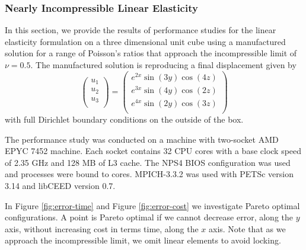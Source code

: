 \subsubsection{Nearly Incompressible Linear Elasticity}

In this section, we provide the results of performance studies for the linear elasticity formulation on a three dimensional unit cube using a manufactured solution for a range of Poisson's ratios that approach the incompressible limit of $\nu = 0.5$.
The manufactured solution is reproducing a final displacement given by
\begin{equation}
\begin{pmatrix}
u_1 \\
u_2 \\
u_3 \\
\end{pmatrix} =
\begin{pmatrix}
e^{2 x} \sin \left( 3 y \right) \cos \left( 4 z \right) \\
e^{3 x} \sin \left( 4 y \right) \cos \left( 2 z \right) \\
e^{4 x} \sin \left( 2 y \right) \cos \left( 3 z \right) \\
\end{pmatrix}
\end{equation}
with full Dirichlet boundary conditions on the outside of the box.

The performance study was conducted on a machine with two-socket AMD EPYC 7452 machine.
Each socket contains 32 CPU cores with a base clock speed of 2.35 GHz and 128 MB of L3 cache.
The NPS4 BIOS configuration was used and processes were bound to cores.
MPICH-3.3.2 was used with PETSc version 3.14 and libCEED version 0.7.

In Figure \ref{fig:error-time} and Figure \ref{fig:error-cost} we investigate Pareto optimal configurations.
A point is Pareto optimal if we cannot decrease error, along the $y$ axis, without increasing cost in terms time, along the $x$ axis.
Note that as we approach the incompressible limit, we omit linear elements to avoid locking.

